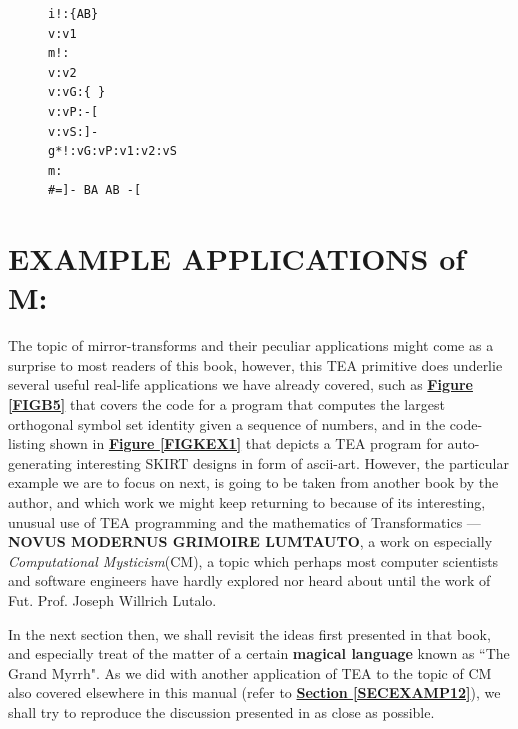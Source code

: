 \documentclass[a4paper, 18pt]{book} %
\begin{document}
\begin{figure}[H]
 \Large
  \centering
  \begin{tcolorbox}[teaterminalstyle, title=M: EXAMPLE 5]
  \begin{lstlisting}[language=TEA]
i!:{AB}
v:v1
m!:
v:v2
v:vG:{ }
v:vP:-[
v:vS:]-
g*!:vG:vP:v1:v2:vS
m:
#=]- BA AB -[ 
   \end{lstlisting}
  \end{tcolorbox}
\end{figure}



\section{EXAMPLE APPLICATIONS of M:}
\label{SECEXAMPM}

  
The topic of mirror-transforms and their peculiar applications might come as a surprise to most readers of this book, however, this TEA primitive does underlie several useful real-life applications we have already covered, such as \textbf{\hyperref[FIGB5]{Figure \ref{FIGB5}}} that covers the code for a program that computes the largest orthogonal symbol set identity given a sequence of numbers, and in the code-listing shown in \textbf{\hyperref[FIGKEX1]{Figure \ref{FIGKEX1}}} that depicts a TEA program for auto-generating interesting SKIRT designs in form of ascii-art. However, the particular example we are to focus on next, is going to be taken from another book by the author, and which work we might keep returning to because of its interesting, unusual use of TEA programming and the mathematics of Transformatics --- \textbf{NOVUS MODERNUS GRIMOIRE LUMTAUTO}\cite{lutalo_2025_grimlumtauto}, a work on especially \textit{Computational Mysticism}(CM), a topic which perhaps most computer scientists and software engineers have hardly explored nor heard about until the work of Fut. Prof. Joseph Willrich Lutalo.

\vspace{2em}

In the next section then, we shall revisit the ideas first presented in that book, and especially treat of the matter of a certain \textbf{magical language} known as ``The Grand Myrrh". As we did with another application of TEA to the topic of CM also covered elsewhere in this manual (refer to \textbf{\hyperref[SECEXAMP12]{Section \ref{SECEXAMP12}}}), we shall try to reproduce the discussion presented in \cite{lutalo_2025_grimlumtauto} as close as possible.
\end{document}
